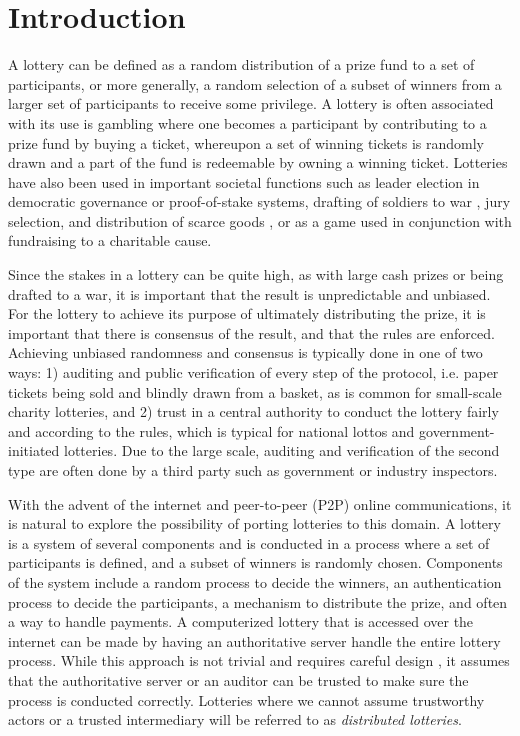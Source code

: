 \chapter{Introduction}
\label{chap:introduction}

A lottery can be defined as a random distribution of a prize fund to a set of participants, or more generally, a random selection of a subset of winners from a larger set of participants to receive some privilege. A lottery is often associated with its use is gambling where one becomes a participant by contributing to a prize fund by buying a ticket, whereupon a set of winning tickets is randomly drawn and a part of the fund is redeemable by owning a winning ticket. Lotteries have also been used in important societal functions such as leader election in democratic governance \cite{sintomer_random_2010} or proof-of-stake systems, drafting of soldiers to war \cite{nixon_executive_1969}, jury selection, and distribution of scarce goods \cite{the_economist_why_2018}, or as a game used in conjunction with fundraising to a charitable cause. 

Since the stakes in a lottery can be quite high, as with large cash prizes or being drafted to a war, it is important that the result is unpredictable and unbiased. For the lottery to achieve its purpose of ultimately distributing the prize, it is important that there is consensus of the result, and that the rules are enforced. Achieving unbiased randomness and consensus is typically done in one of two ways: 1) auditing and public verification of every step of the protocol, i.e. paper tickets being sold and blindly drawn from a basket, as is common for small-scale charity lotteries, and 2) trust in a central authority to conduct the lottery fairly and according to the rules, which is typical for national lottos and government-initiated lotteries. Due to the large scale, auditing and verification of the second type are often done by a third party such as government or industry inspectors.

With the advent of the internet and peer-to-peer (P2P) online communications, it is natural to explore the possibility of porting lotteries to this domain. A lottery is a system of several components and is conducted in a process where a set of participants is defined, and a subset of winners is randomly chosen. Components of the system include a random process to decide the winners, an authentication process to decide the participants, a mechanism to distribute the prize, and often a way to handle payments.  A computerized lottery that is accessed over the internet can be made by having an authoritative server handle the entire lottery process. While this approach is not trivial and requires careful design \cite{sako_implementation_1999, konstantinou_electronic_2004, konstantinou_trust_2005, chen_design_2005, kuacharoen_design_2012, chen_novel_2016}, it assumes that the authoritative server or an auditor can be trusted to make sure the process is conducted correctly. Lotteries where we cannot assume trustworthy actors or a trusted intermediary will be referred to as \emph{distributed lotteries}.

